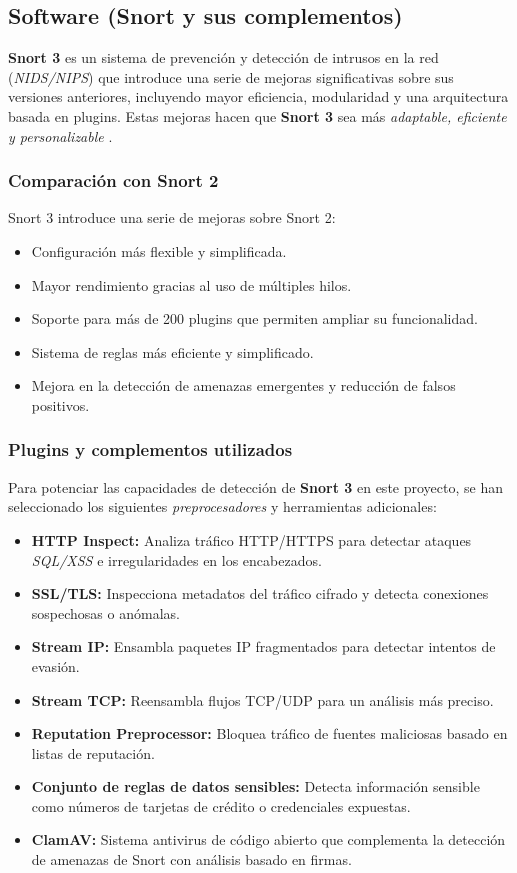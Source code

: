 \documentclass[11pt,a4paper,twoside]{report}
\begin{document}
\subsection{Software (Snort y sus complementos)}
\textbf{Snort 3} es un sistema de prevención y detección de intrusos en la red (\textit{NIDS/NIPS}) que introduce una serie de mejoras significativas sobre sus versiones anteriores, incluyendo mayor eficiencia, modularidad y una arquitectura basada en plugins. Estas mejoras hacen que \textbf{Snort 3} sea más \textit{adaptable, eficiente y personalizable} \cite{snort3_vs_snort2}.

\subsubsection{Comparación con Snort 2}
Snort 3 introduce una serie de mejoras sobre Snort 2:
\begin{itemize}
	\item Configuración más flexible y simplificada.
	\item Mayor rendimiento gracias al uso de múltiples hilos.
	\item Soporte para más de 200 plugins que permiten ampliar su funcionalidad.
	\item Sistema de reglas más eficiente y simplificado.
	\item Mejora en la detección de amenazas emergentes y reducción de falsos positivos.
\end{itemize}

\subsubsection{Plugins y complementos utilizados}
Para potenciar las capacidades de detección de \textbf{Snort 3} en este proyecto, se han seleccionado los siguientes \textit{preprocesadores} y herramientas adicionales:

\begin{itemize}
	\item \textbf{HTTP Inspect:} Analiza tráfico HTTP/HTTPS para detectar ataques \textit{SQL/XSS} e irregularidades en los encabezados.
	\item \textbf{SSL/TLS:} Inspecciona metadatos del tráfico cifrado y detecta conexiones sospechosas o anómalas.
	\item \textbf{Stream IP:} Ensambla paquetes IP fragmentados para detectar intentos de evasión.
	\item \textbf{Stream TCP:} Reensambla flujos TCP/UDP para un análisis más preciso.
	\item \textbf{Reputation Preprocessor:} Bloquea tráfico de fuentes maliciosas basado en listas de reputación. 
	\item \textbf{Conjunto de reglas de datos sensibles:} Detecta información sensible como números de tarjetas de crédito o credenciales expuestas.
	\item \textbf{ClamAV:} Sistema antivirus de código abierto que complementa la detección de amenazas de Snort con análisis basado en firmas.
\end{itemize}
\end{document}
